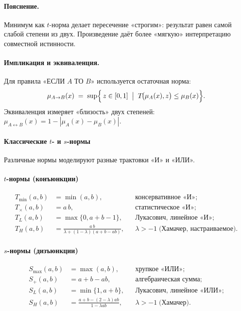 \noindent
\paragraph{Пояснение.}  
Минимум как $t$-норма делает пересечение «строгим»:
результат равен самой слабой степени из двух.
Произведение даёт более «мягкую» интерпретацию
совместной истинности.

\vspace{0.5em}
\noindent
\paragraph{Импликация и эквиваленция.}
Для правила «ЕСЛИ $A$ ТО $B$» используется остаточная норма:
\begin{equation}
  \mu_{A\to B}(x)
  \;=\;
  \sup\Bigl\{\,z\in[0,1]\;\bigm|\;
       T\!\bigl(\mu_A(x),z\bigr)\le \mu_B(x)\Bigr\}.
\end{equation}
Эквиваленция измеряет «близость» двух степеней:
\(
  \mu_{A\leftrightarrow B}(x)=1-|\mu_A(x)-\mu_B(x)|.
\)

\paragraph{Классические $t$- и $s$-нормы}

Различные нормы моделируют разные трактовки «И» и «ИЛИ».

\paragraph{$t$-нормы (конъюнкции)}
\begin{align}
  T_{\min}(a,b) &= \min(a,b), && \text{консервативное «И»};\\
  T_{\times}(a,b) &= a\,b,     && \text{статистическое «И»};\\
  T_{L}(a,b) &= \max\{0,a+b-1\}, && \text{Лукасович, линейное «И»};\\
  T_{H}(a,b) &= 
    \frac{a\,b}{\lambda+(1-\lambda)(a+b-ab)},
    &&\lambda>-1\;\text{(Хамачер, настраиваемое)}.
\end{align}

\paragraph{$s$-нормы (дизъюнкции)}
\begin{align}
  S_{\max}(a,b) &= \max(a,b), && \text{хрупкое «ИЛИ»};\\
  S_{+}(a,b) &= a+b-ab,       && \text{алгебраическая сумма};\\
  S_{L}(a,b) &= \min\{1,a+b\},&& \text{Лукасович, линейное «ИЛИ»};\\
  S_{H}(a,b) &=
    \frac{a+b-(2-\lambda)ab}{1-\lambda ab},
    &&\lambda>-1\;\text{(Хамачер)}.
\end{align}


